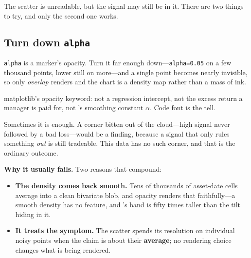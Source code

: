 The scatter is unreadable, but the signal may still be in it. There are two things to try, and only
the second one works.

\subsection{Turn down \texttt{alpha}}\label{sec:alpha-opacity}

\texttt{alpha} is a marker's opacity. Turn it far enough down---\texttt{alpha=0.05} on a few
thousand points, lower still on more---and a single point becomes nearly invisible, so only
\emph{overlap} renders and the chart is a density map rather than a mass of ink.

\begin{note}
matplotlib's opacity keyword: not a regression intercept, not the excess return a manager is paid
for, not 's smoothing constant $\alpha$. Code font is the tell.
\end{note}


Sometimes it is enough. A corner bitten out of the cloud---high signal never followed by a bad
loss---would be a finding, because a signal that only rules something \emph{out} is still tradeable.
This data has no such corner, and that is the ordinary outcome.

\textbf{Why it usually fails.} Two reasons that compound:

\begin{itemize}
  \item \textbf{The density comes back smooth.} Tens of thousands of asset-date cells average into a
        clean bivariate blob, and opacity renders that faithfully---a smooth density has no feature,
        and 's band is fifty times taller than the tilt hiding in it.
  \item \textbf{It treats the symptom.} The scatter spends its resolution on individual noisy points
        when the claim is about their \textbf{average}; no rendering choice changes what is being
        rendered.
\end{itemize}

